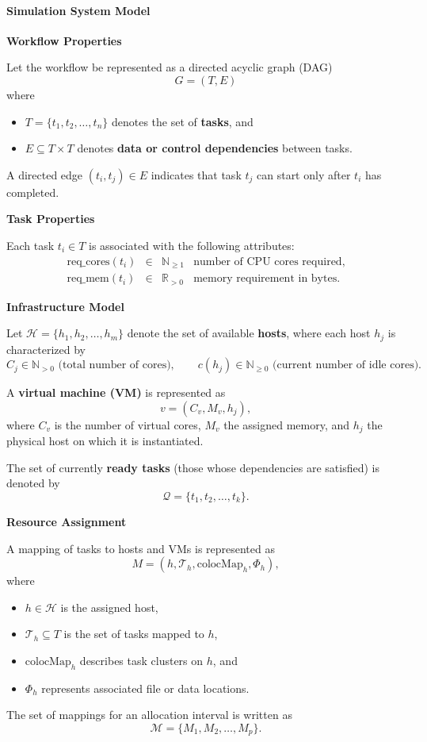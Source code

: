 \paragraph{Simulation System Model}

\textbf{Workflow Properties}

Let the workflow be represented as a directed acyclic graph (DAG)
\[
    G = (T, E)
\]
where
\begin{itemize}
    \item $T = \{t_1, t_2, \dots, t_n\}$ denotes the set of \textbf{tasks}, and
    \item $E \subseteq T \times T$ denotes \textbf{data or control dependencies} between tasks.
\end{itemize}
A directed edge $(t_i, t_j) \in E$ indicates that task $t_j$ can start only after $t_i$ has completed.

\textbf{Task Properties}

Each task \( t_i \in T \) is associated with the following attributes:
\[
    \begin{array}{rcll}
        \text{req\_cores}(t_i) & \in & \mathbb{N}_{\ge 1} & \text{number of CPU cores required}, \\[4pt]
        \text{req\_mem}(t_i)   & \in & \mathbb{R}_{>0}    & \text{memory requirement in bytes.}
    \end{array}
\]

\textbf{Infrastructure Model}

Let \( \mathcal{H} = \{h_1, h_2, \dots, h_m\} \) denote the set of available \textbf{hosts},
where each host \( h_j \) is characterized by
\[
    C_j \in \mathbb{N}_{>0} \text{ (total number of cores)}, \qquad
    c(h_j) \in \mathbb{N}_{\ge 0} \text{ (current number of idle cores).}
\]

A \textbf{virtual machine (VM)} is represented as
\[
    v = (C_v, M_v, h_j),
\]
where \( C_v \) is the number of virtual cores, \( M_v \) the assigned memory,
and \( h_j \) the physical host on which it is instantiated.

The set of currently \textbf{ready tasks} (those whose dependencies are satisfied) is denoted by
\[
    \mathcal{Q} = \{t_1, t_2, \dots, t_k\}.
\]

\textbf{Resource Assignment}

A mapping of tasks to hosts and VMs is represented as
\[
    M = (h, \mathcal{T}_h, \text{colocMap}_h, \Phi_h),
\]
where
\begin{itemize}
    \item $h \in \mathcal{H}$ is the assigned host,
    \item $\mathcal{T}_h \subseteq T$ is the set of tasks mapped to $h$,
    \item $\text{colocMap}_h$ describes task clusters on $h$, and
    \item $\Phi_h$ represents associated file or data locations.
\end{itemize}
The set of mappings for an allocation interval is written as
\[
    \mathcal{M} = \{ M_1, M_2, \dots, M_p \}.
\]

